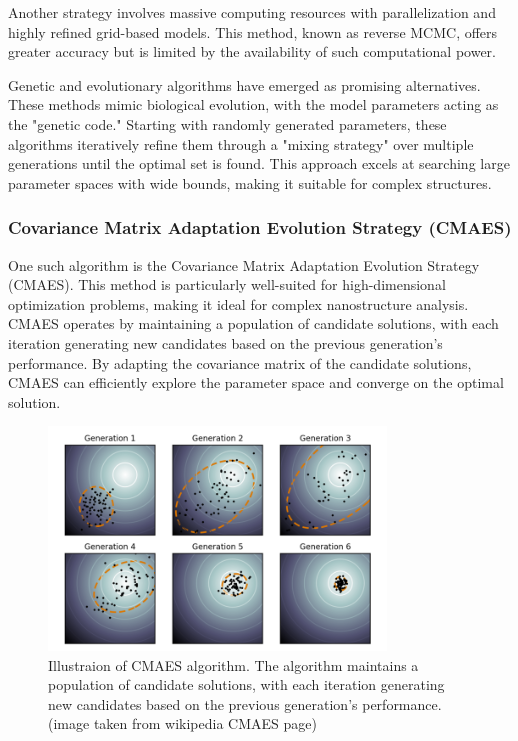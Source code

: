 \medskip

Another strategy involves massive computing resources with parallelization and highly refined grid-based models. This method, known as reverse MCMC, offers greater accuracy but is limited by the availability of such computational power.

\medskip

Genetic and evolutionary algorithms have emerged as promising alternatives. These methods mimic biological evolution, with the model parameters acting as the "genetic code." Starting with randomly generated parameters, these algorithms iteratively refine them through a "mixing strategy" over multiple generations until the optimal set is found. This approach excels at searching large parameter spaces with wide bounds, making it suitable for complex structures.

\subsubsection{Covariance Matrix Adaptation Evolution Strategy (CMAES)}

One such algorithm is the Covariance Matrix Adaptation Evolution Strategy (CMAES). This method is particularly well-suited for high-dimensional optimization problems, making it ideal for complex nanostructure analysis. CMAES operates by maintaining a population of candidate solutions, with each iteration generating new candidates based on the previous generation's performance. By adapting the covariance matrix of the candidate solutions, CMAES can efficiently explore the parameter space and converge on the optimal solution.

\begin{figure}[h]
    \centering
    \includegraphics[width=0.8\textwidth]{images/CMAES.png}
    \caption{Illustraion of CMAES algorithm. The algorithm maintains a population of candidate solutions, with each iteration generating new candidates based on the previous generation's performance.(image taken from wikipedia CMAES page) }
    \label{fig:cmaes}
\end{figure}

